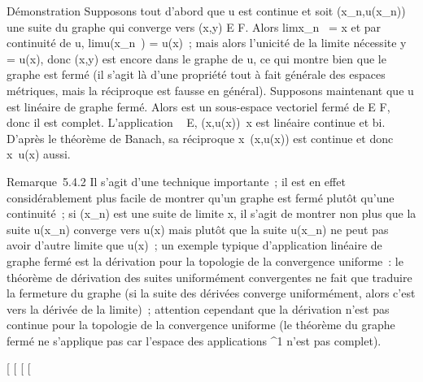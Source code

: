 \documentclass[]{article}
\begin{document}
Démonstration Supposons tout d'abord que u est continue et soit
(x\_n,u(x\_n)) une suite du graphe qui converge vers
(x,y) \in E \times F. Alors limx\_n~ = x et
par continuité de u, limu(x\_n~) =
u(x)~; mais alors l'unicité de la limite nécessite y = u(x), donc (x,y)
est encore dans le graphe de u, ce qui montre bien que le graphe est
fermé (il s'agit là d'une propriété tout à fait générale des espaces
métriques, mais la réciproque est fausse en général). Supposons
maintenant que u est linéaire de graphe \Gamma fermé. Alors \Gamma est un
sous-espace vectoriel fermé de E \times F, donc il est complet. L'application
\Gamma \rightarrow~ E, (x,u(x))\mapsto~x est linéaire continue et
bi\jmathective. D'après le théorème de Banach, sa réciproque
x\mapsto~(x,u(x)) est continue et donc
x\mapsto~u(x) aussi.

Remarque~5.4.2 Il s'agit d'une technique importante~; il est en effet
considérablement plus facile de montrer qu'un graphe est fermé plutôt
qu'une continuité~; si (x\_n) est une suite de limite x, il
s'agit de montrer non plus que la suite u(x\_n) converge vers
u(x) mais plutôt que la suite u(x\_n) ne peut pas avoir d'autre
limite que u(x)~; un exemple typique d'application linéaire de graphe
fermé est la dérivation pour la topologie de la convergence uniforme~:
le théorème de dérivation des suites uniformément convergentes ne fait
que traduire la fermeture du graphe (si la suite des dérivées converge
uniformément, alors c'est vers la dérivée de la limite)~; attention
cependant que la dérivation n'est pas continue pour la topologie de la
convergence uniforme (le théorème du graphe fermé ne s'applique pas car
l'espace des applications ^1 n'est pas complet).

{[}
{[}
{[}
{[}
\end{document}
